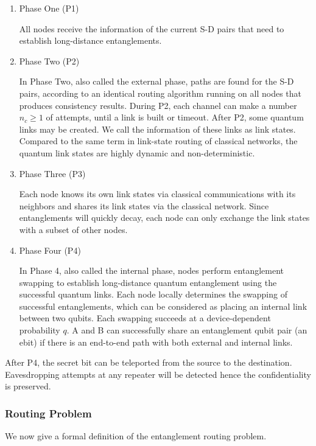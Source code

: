 \documentclass[10pt]{article}
\begin{document}
\begin{enumerate}
    \item Phase One (P1)
    
    All nodes receive the information of the current S-D pairs that need to establish long-distance entanglements. 

    \item Phase Two (P2)
    
    In Phase Two, also called the external phase, paths are found for the S-D pairs, according to an identical routing algorithm running on all nodes that produces consistency results. During P2, each channel can make a number $n_c\geq 1$ of attempts, until a link is built or timeout.
    After P2, some quantum links may be created.
    We call the information of these links as link states. Compared to
    the same term in link-state routing of classical networks, the
    quantum link states are highly dynamic and non-deterministic.
    
    \item Phase Three (P3)
    
    Each node knows its own link states via classical communications with its neighbors and shares its link states via the classical network. Since entanglements will quickly decay, each node can only exchange the link states with a subset of other nodes.

    \item Phase Four (P4)
    
    In Phase 4, also called the internal phase, nodes perform entanglement swapping to establish long-distance quantum entanglement using the successful quantum links. Each node locally determines the swapping of successful entanglements, which can be considered as placing an internal link between two qubits. Each swapping succeeds at a device-dependent probability $q$. A and B can successfully share an entanglement qubit pair (an ebit) if there is an end-to-end path with both external and internal links.
\end{enumerate}

After P4, the secret bit can be teleported from the source to the destination. Eavesdropping attempts at any repeater will be detected hence the confidentiality is preserved.

\subsubsection{Routing Problem}

We now give a formal definition of the entanglement routing problem.
\end{document}
